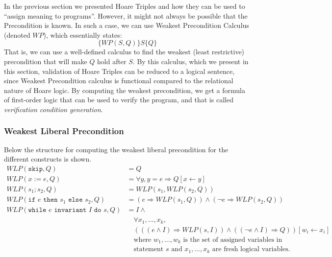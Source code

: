 

In the previous section we presented Hoare Triples and how they can be used to ``assign meaning to programs''. However, it might not always be possible that the Precondition is known. In such a case, we can use Weakest Precondition Calculus (denoted $WP$), which essentially states:
$$
 \{WP(S,Q)\}S\{Q\}
$$
That is, we can use a well-defined calculus to find the weakest (least restrictive) precondition that will make $Q$ hold after $S$. By this calculus, which we present in this section, validation of Hoare Triples can be reduced to a logical sentence, since Weakest Precondition calculus is functional compared to the relational nature of Hoare logic.
By computing the weakest precondition, we get a formula of first-order logic that can be used to verify the program, and that is called \textit{verification condition generation}.

\subsubsection{Weakest Liberal Precondition}
Below the structure for computing the weakest liberal precondition for the different constructs is shown.
\begin{align*}
	WLP(\texttt{skip}, Q) &= Q \\
	WLP(x:=e,Q) &= \forall y, y = e \Rightarrow Q[x \leftarrow y] \\
	WLP(s_1;s_2, Q) &= WLP(s_1, WLP(s_2, Q)) \\
	WLP(\texttt{if } e \texttt{ then } s_1 \texttt{ else } s_2, Q) &= (e \Rightarrow WLP(s_1, Q)) \land (\neg e \Rightarrow WLP(s_2, Q)) \\
	WLP(\texttt{while } e \texttt{ invariant } I \texttt{ do } s, Q) &= 
		I \land \\
    &\quad \forall x_1, ..., x_k, \\
    &\quad (((e \land I) \Rightarrow WLP(s, I)) \land (( \neg e \land I) \Rightarrow Q))
       [w_i \leftarrow x_i] \\
	&\quad \text{where } w_1, ..., w_k \text{ is the set of assigned variables in} \\
  &\quad \text{statement } s \text{ and } x_1, ..., x_k \text{ are fresh logical variables.}
\end{align*}

